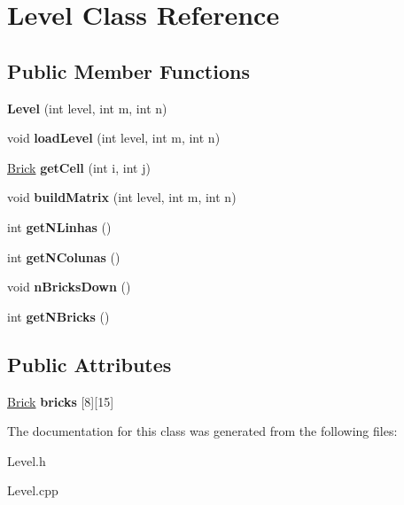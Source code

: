 \hypertarget{classLevel}{\section{\-Level \-Class \-Reference}
\label{classLevel}
}
\subsection*{\-Public \-Member \-Functions}
\begin{DoxyCompactItemize}
\item 
\hypertarget{classLevel_a48ffe775b5db813d30345193940c38f1}{{\bfseries \-Level} (int level, int m, int n)}\label{classLevel_a48ffe775b5db813d30345193940c38f1}

\item 
\hypertarget{classLevel_a360279fc2b29e9b692c1bb49b81f7089}{void {\bfseries load\-Level} (int level, int m, int n)}\label{classLevel_a360279fc2b29e9b692c1bb49b81f7089}

\item 
\hypertarget{classLevel_a2cd065f4d001fb3691cacbfb4f23b322}{\hyperlink{classBrick}{\-Brick} {\bfseries get\-Cell} (int i, int j)}\label{classLevel_a2cd065f4d001fb3691cacbfb4f23b322}

\item 
\hypertarget{classLevel_ada477dcc4223f09f2a896f307daa06a0}{void {\bfseries build\-Matrix} (int level, int m, int n)}\label{classLevel_ada477dcc4223f09f2a896f307daa06a0}

\item 
\hypertarget{classLevel_aa5cf9a91b95142b8075cd1ba6e6fc062}{int {\bfseries get\-N\-Linhas} ()}\label{classLevel_aa5cf9a91b95142b8075cd1ba6e6fc062}

\item 
\hypertarget{classLevel_a7a07e792f90e967c07d7c8379d272b7c}{int {\bfseries get\-N\-Colunas} ()}\label{classLevel_a7a07e792f90e967c07d7c8379d272b7c}

\item 
\hypertarget{classLevel_ac022c67ce4529765d2687a9435657e2e}{void {\bfseries n\-Bricks\-Down} ()}\label{classLevel_ac022c67ce4529765d2687a9435657e2e}

\item 
\hypertarget{classLevel_a7afb7349a2dfbc61430fe4aacc3c7d64}{int {\bfseries get\-N\-Bricks} ()}\label{classLevel_a7afb7349a2dfbc61430fe4aacc3c7d64}

\end{DoxyCompactItemize}
\subsection*{\-Public \-Attributes}
\begin{DoxyCompactItemize}
\item 
\hypertarget{classLevel_a6d46667fda535ac4e9b5f34daec5c7de}{\hyperlink{classBrick}{\-Brick} {\bfseries bricks} \mbox{[}8\mbox{]}\mbox{[}15\mbox{]}}\label{classLevel_a6d46667fda535ac4e9b5f34daec5c7de}

\end{DoxyCompactItemize}


\-The documentation for this class was generated from the following files\-:\begin{DoxyCompactItemize}
\item 
\-Level.\-h\item 
\-Level.\-cpp\end{DoxyCompactItemize}
